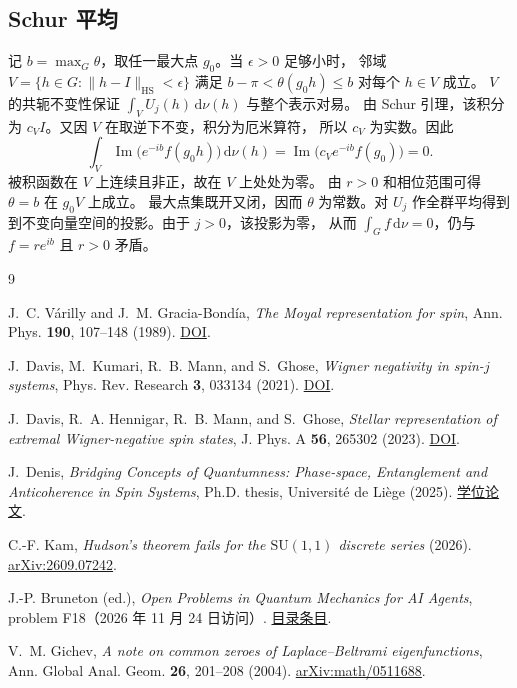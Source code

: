 \documentclass[UTF8,11pt,a4paper]{ctexart}
\theoremstyle{definition}
\newcommand{\SU}{\mathrm{SU}}
\newcommand{\dd}{\,\mathrm{d}}
\begin{document}
\subsection{Schur 平均}

记 \(b=\max_G\theta\)，取任一最大点 \(g_0\)。当 \(\epsilon>0\) 足够小时，
邻域 \(V=\{h\in G:\|h-I\|_{\mathrm{HS}}<\epsilon\}\) 满足
\(b-\pi<\theta(g_0h)\leq b\) 对每个 \(h\in V\) 成立。
\(V\) 的共轭不变性保证 \(\int_V U_j(h)\dd\nu(h)\) 与整个表示对易。
由 Schur 引理，该积分为 \(c_V I\)。又因 \(V\) 在取逆下不变，积分为厄米算符，
所以 \(c_V\) 为实数。因此
\[
  \int_V\operatorname{Im}\bigl(e^{-ib}f(g_0h)\bigr)\dd\nu(h)
  =\operatorname{Im}\bigl(c_V e^{-ib}f(g_0)\bigr)=0 .
\]
被积函数在 \(V\) 上连续且非正，故在 \(V\) 上处处为零。
由 \(r>0\) 和相位范围可得 \(\theta=b\) 在 \(g_0V\) 上成立。
最大点集既开又闭，因而 \(\theta\) 为常数。对 \(U_j\) 作全群平均得到
到不变向量空间的投影。由于 \(j>0\)，该投影为零，
从而 \(\int_G f\dd\nu=0\)，仍与 \(f=r e^{ib}\) 且 \(r>0\) 矛盾。

\clearpage
\begin{thebibliography}{9}
\small
\raggedright
\setlength{\itemsep}{3pt}

J.~C. V\'arilly and J.~M. Gracia-Bond\'ia,
\emph{The Moyal representation for spin},
Ann. Phys. \textbf{190}, 107--148 (1989).
\href{https://doi.org/10.1016/0003-4916(89)90262-5}{DOI}.

J.~Davis, M.~Kumari, R.~B. Mann, and S.~Ghose,
\emph{Wigner negativity in spin-\(j\) systems},
Phys. Rev. Research \textbf{3}, 033134 (2021).
\href{https://doi.org/10.1103/PhysRevResearch.3.033134}{DOI}.

J.~Davis, R.~A. Hennigar, R.~B. Mann, and S.~Ghose,
\emph{Stellar representation of extremal Wigner-negative spin states},
J. Phys. A \textbf{56}, 265302 (2023).
\href{https://doi.org/10.1088/1751-8121/acd918}{DOI}.

J.~Denis, \emph{Bridging Concepts of Quantumness: Phase-space,
Entanglement and Anticoherence in Spin Systems},
Ph.D. thesis, Universit\'e de Li\`ege (2025).
\href{https://hdl.handle.net/2268/336540}{学位论文}.

C.-F. Kam, \emph{Hudson's theorem fails for the \(\SU(1,1)\)
discrete series} (2026).
\href{https://arxiv.org/abs/2609.07242}{\mbox{arXiv:2609.07242}}.

J.-P. Bruneton (ed.), \emph{Open Problems in Quantum Mechanics
for AI Agents}, problem F18（2026 年 11 月 24 日访问）.
\href{https://openquantumproblems.com/p/F18}{目录条目}.

V.~M. Gichev, \emph{A note on common zeroes of Laplace--Beltrami
eigenfunctions}, Ann. Global Anal. Geom. \textbf{26}, 201--208 (2004).
\href{https://arxiv.org/abs/math/0511688}{\mbox{arXiv:math/0511688}}.

\end{thebibliography}
\end{document}
